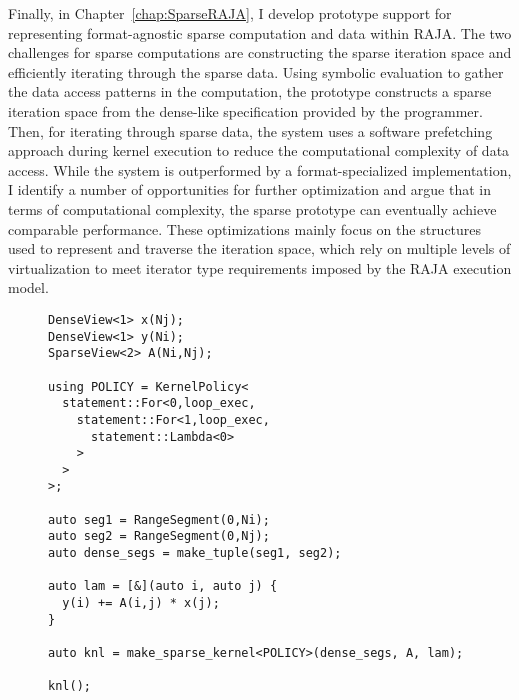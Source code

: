 Finally, in Chapter~\ref{chap:SparseRAJA}, I develop prototype support for representing format-agnostic sparse computation and data within RAJA\@.
The two challenges for sparse computations are constructing the sparse iteration space and efficiently iterating through the sparse data.
Using symbolic evaluation to gather the data access patterns in the computation, the prototype constructs a sparse iteration space from the dense-like specification provided by the programmer.
Then, for iterating through sparse data, the system uses a software prefetching approach during kernel execution to reduce the computational complexity of data access.
While the system is outperformed by a format-specialized implementation, I identify a number of opportunities for further optimization and argue that in terms of computational complexity, the sparse prototype can eventually achieve comparable performance.
These optimizations mainly focus on the structures used to represent and traverse the iteration space, which rely on multiple levels of virtualization to meet iterator type requirements imposed by the RAJA execution model.
\begin{figure}
\begin{lstlisting}[caption={Implementation of SpMV using the SparseRAJA prototype},label=Intro:SparseRAJAMV]
DenseView<1> x(Nj);
DenseView<1> y(Ni);
SparseView<2> A(Ni,Nj);

using POLICY = KernelPolicy<
  statement::For<0,loop_exec,
    statement::For<1,loop_exec,
      statement::Lambda<0>
    >
  >
>;

auto seg1 = RangeSegment(0,Ni);
auto seg2 = RangeSegment(0,Nj);
auto dense_segs = make_tuple(seg1, seg2);

auto lam = [&](auto i, auto j) {
  y(i) += A(i,j) * x(j);
}

auto knl = make_sparse_kernel<POLICY>(dense_segs, A, lam);
  
knl();
\end{lstlisting}
\end{figure}







